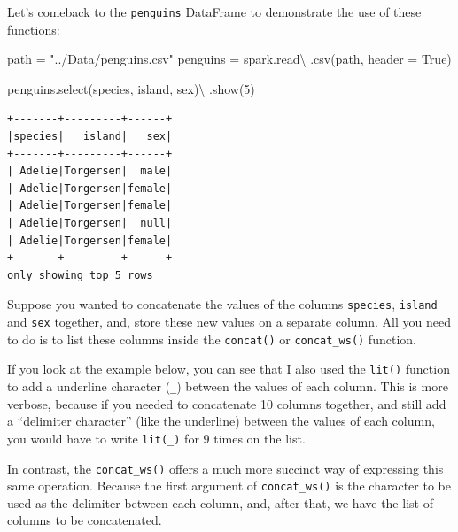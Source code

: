 \documentclass[
  11pt,
  letterpaper,
  DIV=11,
  numbers=noendperiod]{scrreprt}
\newenvironment{Shaded}{\begin{snugshade}}{\end{snugshade}}
\newcommand{\DecValTok}[1]{\textcolor[rgb]{0.68,0.00,0.00}{#1}}
\newcommand{\NormalTok}[1]{\textcolor[rgb]{0.00,0.23,0.31}{#1}}
\newcommand{\OperatorTok}[1]{\textcolor[rgb]{0.37,0.37,0.37}{#1}}
\newcommand{\StringTok}[1]{\textcolor[rgb]{0.13,0.47,0.30}{#1}}
\newcommand{\VariableTok}[1]{\textcolor[rgb]{0.07,0.07,0.07}{#1}}
\begin{document}
Let's comeback to the \texttt{penguins} DataFrame to demonstrate the use
of these functions:

\begin{Shaded}
\begin{Highlighting}[]
\NormalTok{path }\OperatorTok{=} \StringTok{"../Data/penguins.csv"}
\NormalTok{penguins }\OperatorTok{=}\NormalTok{ spark.read}\OperatorTok{\textbackslash{}}
\NormalTok{    .csv(path, header }\OperatorTok{=} \VariableTok{True}\NormalTok{)}

\NormalTok{penguins.select(}\StringTok{\textquotesingle{}species\textquotesingle{}}\NormalTok{, }\StringTok{\textquotesingle{}island\textquotesingle{}}\NormalTok{, }\StringTok{\textquotesingle{}sex\textquotesingle{}}\NormalTok{)}\OperatorTok{\textbackslash{}}
\NormalTok{    .show(}\DecValTok{5}\NormalTok{)}
\end{Highlighting}
\end{Shaded}

\begin{verbatim}
+-------+---------+------+
|species|   island|   sex|
+-------+---------+------+
| Adelie|Torgersen|  male|
| Adelie|Torgersen|female|
| Adelie|Torgersen|female|
| Adelie|Torgersen|  null|
| Adelie|Torgersen|female|
+-------+---------+------+
only showing top 5 rows
\end{verbatim}

Suppose you wanted to concatenate the values of the columns
\texttt{species}, \texttt{island} and \texttt{sex} together, and, store
these new values on a separate column. All you need to do is to list
these columns inside the \texttt{concat()} or \texttt{concat\_ws()}
function.

If you look at the example below, you can see that I also used the
\texttt{lit()} function to add a underline character (\texttt{\_})
between the values of each column. This is more verbose, because if you
needed to concatenate 10 columns together, and still add a ``delimiter
character'' (like the underline) between the values of each column, you
would have to write \texttt{lit(\textquotesingle{}\_\textquotesingle{})}
for 9 times on the list.

In contrast, the \texttt{concat\_ws()} offers a much more succinct way
of expressing this same operation. Because the first argument of
\texttt{concat\_ws()} is the character to be used as the delimiter
between each column, and, after that, we have the list of columns to be
concatenated.
\end{document}
